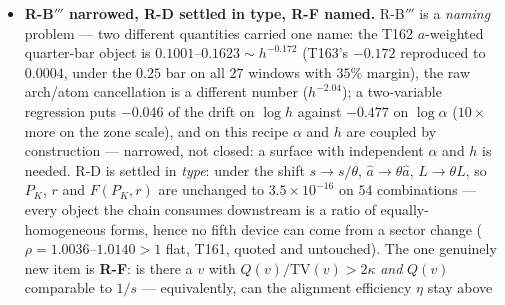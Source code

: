 \documentclass[11pt]{article}
\begin{document}
\begin{itemize}[leftmargin=1.5em]
$Q/\mathrm{TV}$ and $\delta_{\mathrm{bnd}}$ are the \emph{same numbers in every
sector} --- the entry normalisation is a \textbf{gauge} (machine-checked to
$8.8\times10^{-10}$ over $5670$ sector-by-vector combinations, declared horizon
$2.6\times10^{-8}$); the full space is strictly worse ($\mu_0=0$ exactly, no
finite floor); a shifted or weighted sector does flatten the floor
($h^{+0.000}$ at $\kappa_s=4$) but pays the transfer factor
$1/\theta\sim h^{+1.997}$, and floor${}\times{}$transfer $=1/\mu^P_1$
\emph{identically} --- the two exponents sum to $+1.997$ at every shift on the
declared grid to $10^{-9}$: the $h^2$ lives in the ratio, never in the floor.
The genuine surprise, stated and immediately priced: a normalisation-free
first-order ascent on $Q/\mathrm{TV}$ over the full window reaches
$2.38$--$74.57$ against the crossing bar $2\kappa=0.0776$ --- $31$--$960\times$
over on $9/9$ windows ($\delta_{\mathrm{bnd}}=-0.124\ldots-0.090$, alignment
efficiency $\eta=7.9$--$11.1\%$ of the Abel ceiling
$\|C\|_\infty=30.3$--$930.6\sim h^{+1.185}$) --- and T163's TV floor
\emph{holds on the unconstrained optimiser} ($\mathrm{TV}\,\mu^P_1=8.30$--$11.72
\ge1$, a family T163 never searched), at a price $h^{+3.299}$, worse than
T163's crossing price $h^{+1.91}$: dropping the normalisation relocated the
difficulty without reducing it.
\item \textbf{R-B$'''$ narrowed, R-D settled in type, R-F named.} R-B$'''$ is a
\emph{naming} problem --- two different quantities carried one name: the T162
$a$-weighted quarter-bar object is $0.1001$--$0.1623\sim h^{-0.172}$ (T163's
$-0.172$ reproduced to $0.0004$, under the $0.25$ bar on all $27$ windows with
$35\%$ margin), the raw arch/atom cancellation is a different number
($h^{-2.04}$); a two-variable regression puts $-0.046$ of the drift on
$\log h$ against $-0.477$ on $\log\alpha$ ($10\times$ more on the zone scale),
and on this recipe $\alpha$ and $h$ are coupled by construction --- narrowed,
not closed: a surface with independent $\alpha$ and $h$ is needed. R-D is
settled in \emph{type}: under the shift $s\to s/\theta$,
$\hat a\to\theta\hat a$, $L\to\theta L$, so $P_K$, $r$ and $F(P_K,r)$ are
unchanged to $3.5\times10^{-16}$ on $54$ combinations --- every object the
chain consumes downstream is a ratio of equally-homogeneous forms, hence no
fifth device can come from a sector change ($\rho=1.0036$--$1.0140>1$ flat,
T161, quoted and untouched). The one genuinely new item is \textbf{R-F}: is
there a $v$ with $Q(v)/\mathrm{TV}(v)>2\kappa$ \emph{and} $Q(v)$ comparable to
$1/s$ --- equivalently, can the alignment efficiency $\eta$ stay above

\end{itemize}
\end{document}
